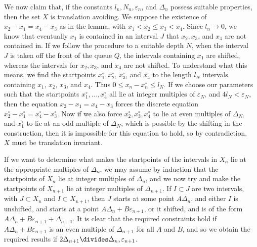 \documentclass{report}
\theoremstyle{plain}
\theoremstyle{plain}
\begin{document}
We now claim that, if the constants $l_n, N_n, \varepsilon_n$, and $\Delta_n$ possess suitable properties, then the set $X$ is translation avoiding. We suppose the existence of $x_2 - x_1 = x_4 - x_3$ as in the lemma, with $x_1 < x_2 \leq x_3 < x_4$. Since $l_n \to 0$, we know that eventually $x_1$ is contained in an interval $J$ that $x_2,x_3$, and $x_4$ are not contained in. If we follow the procedure to a suitable depth $N$, when the interval $J$ is taken off the front of the queue $Q$, the intervals containing $x_1$ are shifted, whereas the intervals for $x_2,x_3$, and $x_4$ are not shifted. To understand what this means, we find the startpoints $x_1^\circ, x_2^\circ$, $x_3^\circ$, and $x_4^\circ$ to the length $l_N$ intervals containing $x_1$, $x_2$, $x_3$, and $x_4$. Thus $0 \leq x_n - x_n^\circ \leq l_N$. If we choose our parameters such that the startpoints $x_1^\circ, \dots, x_4^\circ$ all lie at integer multiples of $\varepsilon_N$, and $4l_N < \varepsilon_N$, then the equation $x_2 - x_1 = x_4 - x_3$ forces the discrete equation $x_2^\circ - x_1^\circ = x_4^\circ - x_3^\circ$. Now if we also force $x_2^\circ, x_3^\circ, x_4^\circ$ to lie at even multiples of $\Delta_N$, and $x_1^\circ$ to lie at an odd multiple of $\Delta_N$, which is possible by the shifting in the construction, then it is impossible for this equation to hold, so by contradiction, $X$ must be translation invariant.

If we want to determine what makes the startpoints of the intervals in $X_n$ lie at the appropriate multiples of $\Delta_n$, we may assume by induction that the startpoints of $X_n$ lie at integer multiples of $\Delta_n$, and we now try and make the startpoints of $X_{n+1}$ lie at integer multiples of $\Delta_{n+1}$. If $I \subset J$ are two intervals, with $J \subset X_n$ and $I \subset X_{n+1}$, then $J$ starts at some point $A \Delta_n$, and either $I$ is unshifted, and starts at a point $A \Delta_n + B \varepsilon_{n+1}$, or it shifted, and is of the form $A \Delta_n + B \varepsilon_{n+1} + \Delta_{n+1}$. It is clear that the required constraints hold if $A \Delta_n + B \varepsilon_{n+1}$ is an even multiple of $\Delta_{n+1}$ for all $A$ and $B$, and so we obtain the required results if $2 \Delta_{n+1} \divides \Delta_n, \varepsilon_{n+1}$. 
\end{document}
